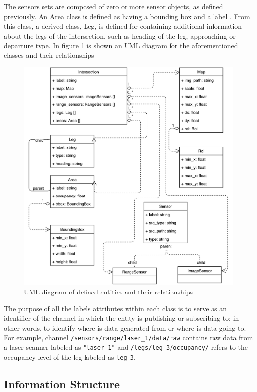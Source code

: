 The sensors sets are composed of zero or more sensor objects, as defined previously. An Area class is defined as having a bounding box and a label	. From this class, a derived class, Leg, is defined for containing additional information about the legs of the intersection, such as heading of the leg, approaching or departure type. In figure \ref{data_model} is shown an UML diagram for the aforementioned classes and their relationships

\begin{figure}[ht!]
\centering
\includegraphics[scale=0.5]{fig/3/data_model.pdf}
\caption{UML diagram of defined entities and their relationships}
\label{data_model}
\end{figure}

The purpose of all the labels attributes within each class is to serve as an identifier of the channel in which the entity is publishing or subscribing to; in other words, to identify where is data generated from or where is data going to. For example, channel \texttt{/sensors/range/laser\_1/data/raw} contains raw data from a laser scanner labeled as \texttt{"laser\_1"} and \texttt{/legs/leg\_3/occupancy/} refers to the occupancy level of the leg labeled as \texttt{leg\_3}.

\subsection{Information Structure}

